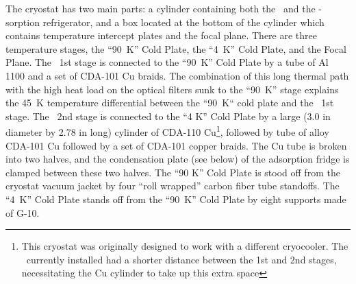 The cryostat has two main parts: a cylinder containing both the \PTC\ and the -sorption refrigerator, and a box located at the bottom of the cylinder which contains temperature intercept plates and the focal plane.
There are three temperature stages, the ``\SI{90}{\K}'' Cold Plate, the ``\SI{4}{\K}'' Cold Plate, and the Focal Plane.
The \PTC\ 1st stage is connected to the ``\SI{90}{\K}'' Cold Plate by a tube of Al 1100 and a set of CDA-101 Cu braids.
The combination of this long thermal path with the high heat load on the optical filters sunk to the ``\SI{90}{\K}'' stage explains the \SI{45}{\K} temperature differential between the ``\SI{90}{\K}`` cold plate and the \PTC\ 1st stage.
The \PTC\ 2nd stage is connected to the ``4 K'' Cold Plate by a large (3.0 in diameter by 2.78 in long) cylinder of CDA-110 Cu\footnote{This cryostat was originally designed to work with a different cryocooler. The \PTC\ currently installed had a shorter distance between the 1st and 2nd stages, necessitating the Cu cylinder to take up this extra space}, followed by tube of alloy CDA-101 Cu followed by a set of  CDA-101 copper braids.
The Cu tube is broken into two halves, and the condensation plate (see below) of the adsorption fridge is clamped between these two halves. The ``90 K'' Cold Plate is stood off from the cryostat vacuum jacket by four ``roll wrapped'' carbon fiber tube standoffs. The ``\SI{4}{\K}'' Cold Plate stands off from the ``\SI{90}{\K}'' Cold Plate by eight supports made of G-10.

